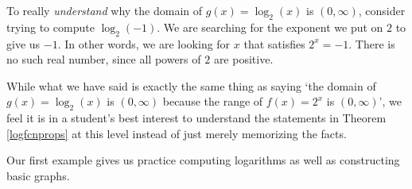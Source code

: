 \documentclass{ximera}
\begin{document}
 

To really \textit{understand} why the domain of $g(x) = \log_{2}(x)$ is $(0,\infty)$,  consider trying to compute $\log_{2}(-1)$.   We are searching for the exponent we put on $2$ to give us $-1$.  In other words, we are looking for $x$ that satisfies $2^{x} = -1$.  There is no such real number, since all powers of $2$ are positive. 

 

 While what we have said is exactly the same thing as saying `the domain of $g(x) = \log_{2}(x)$ is $(0,\infty)$ because the range of $f(x) = 2^{x}$ is $(0,\infty)$', we feel it is in a student's best interest to understand the statements in Theorem \ref{logfcnprops} at this level instead of just merely memorizing the facts.
 
 
 
 Our first example gives us practice computing logarithms as well as constructing basic graphs.
 
\newpage
\end{document}
